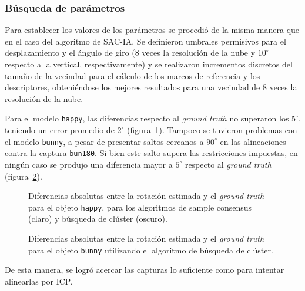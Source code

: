 		\subsubsection{Búsqueda de parámetros}
			Para establecer los valores de los parámetros se procedió de la
			misma manera que en el caso del algoritmo de SAC-IA.
			Se definieron umbrales permisivos para el desplazamiento y el ángulo de giro
			($8$ veces la resolución de la nube y $10^\circ$ respecto a la vertical, respectivamente)
			y se realizaron incrementos discretos del tamaño de la vecindad para el cálculo de los marcos de referencia y los descriptores,
			obteniéndose los mejores resultados para una vecindad de $8$ veces la resolución de la nube.

			Para el modelo \texttt{happy}, las diferencias respecto al \emph{ground truth}
			no superaron los $5^{\circ}$, teniendo un error promedio de $2^{\circ}$ (figura~\ref{fig:dif_rot_happy}).
			Tampoco se tuvieron problemas con el modelo \texttt{bunny},
			a pesar de presentar saltos cercanos a $90^{\circ}$ en las alineaciones
			contra la captura \texttt{bun180}. Si bien este salto supera las restricciones impuestas,
			en ningún caso se produjo una diferencia mayor a $5^{\circ}$ respecto al \emph{ground truth} (figura~\ref{fig:clust_bunny}).


			\begin{figure}[t]
				
				\caption[Diferencias en la rotación estimada para el objeto \texttt{happy}]
				{\label{fig:dif_rot_happy}Diferencias absolutas entre la rotación estimada y el \emph{ground truth} para el objeto \texttt{happy},
				para los algoritmos de sample consensus (claro) y búsqueda de clúster (oscuro).}
			\end{figure}

			\begin{figure}
				
				\caption[Diferencias en la rotación estimada para el objeto \texttt{bunny}]
				{\label{fig:clust_bunny}Diferencias absolutas entre la rotación estimada y el \emph{ground truth} para el objeto \texttt{bunny} utilizando el algoritmo de búsqueda de clúster.}
			\end{figure}

			De esta manera, se logró acercar las capturas lo suficiente como
			para intentar alinearlas por ICP.




